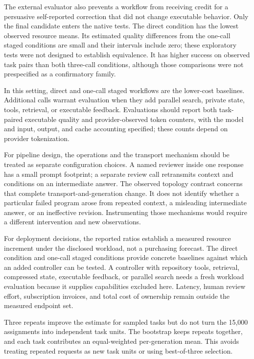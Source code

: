 The external evaluator also prevents a workflow from receiving credit for a persuasive self-reported correction that did not change executable behavior. Only the final candidate enters the native tests. The direct condition has the lowest observed resource means. Its estimated quality differences from the one-call staged conditions are small and their intervals include zero; these exploratory tests were not designed to establish equivalence. It has higher success on observed task pairs than both three-call conditions, although those comparisons were not prespecified as a confirmatory family.

In this setting, direct and one-call staged workflows are the lower-cost baselines. Additional calls warrant evaluation when they add parallel search, private state, tools, retrieval, or executable feedback. Evaluations should report both task-paired executable quality and provider-observed token counters, with the model and input, output, and cache accounting specified; these counts depend on provider tokenization.

For pipeline design, the operations and the transport mechanism should be treated as separate configuration choices. A named reviewer inside one response has a small prompt footprint; a separate review call retransmits context and conditions on an intermediate answer. The observed topology contrast concerns that complete transport-and-generation change. It does not identify whether a particular failed program arose from repeated context, a misleading intermediate answer, or an ineffective revision. Instrumenting those mechanisms would require a different intervention and new observations.

For deployment decisions, the reported ratios establish a measured resource increment under the disclosed workload, not a purchasing forecast. The direct condition and one-call staged conditions provide concrete baselines against which an added controller can be tested. A controller with repository tools, retrieval, compressed state, executable feedback, or parallel search needs a fresh workload evaluation because it supplies capabilities excluded here. Latency, human review effort, subscription invoices, and total cost of ownership remain outside the measured endpoint set.


Three repeats improve the estimate for sampled tasks but do not turn the 15,000 assignments into independent task units. The bootstrap keeps repeats together, and each task contributes an equal-weighted per-generation mean. This avoids treating repeated requests as new task units or using best-of-three selection.

